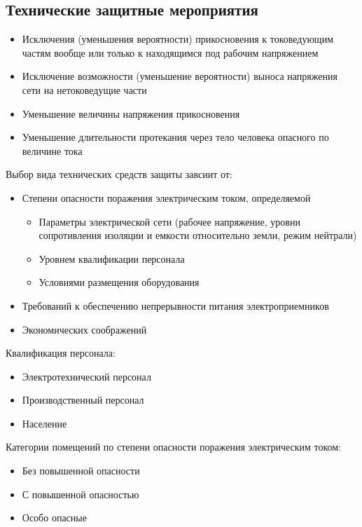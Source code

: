 \documentclass[a4paper, 14pt]{extarticle}
\begin{document}
\subsection{Технические защитные мероприятия}
\begin{itemize}
    \item Исключения (уменьшения вероятности) прикосновения к токоведующим частям вообще или только к находящимся под рабочим напряжением
    \item Исключение возможности (уменьшение вероятности) выноса напряжения сети на нетоковедущие части
    \item Уменьшение величины напряжения прикосновения
    \item Уменьшение длительности протекания через тело человека опасного по величине тока
\end{itemize}

Выбор вида технических средств защиты завсиит от:
\begin{itemize}
    \item Степени опасности поражения электрическим током, определяемой
    \begin{itemize}
        \item Параметры электрической сети (рабочее напряжение, уровни сопротивления изоляции и емкости относительно земли, режим нейтрали)
        \item Уровнем квалификации персонала
        \item Условиями размещения оборудования
    \end{itemize}
    \item Требований к обеспечению непрерывности питания электроприемников
    \item Экономических соображений
\end{itemize}

Квалификация персонала:
\begin{itemize}
    \item Электротехнический персонал
    \item Производственный персонал
    \item Население
\end{itemize}

Категории помещений по степени опасности поражения электрическим током:
\begin{itemize}
    \item Без повышенной опасности
    \item С повышенной опасностью
    \item Особо опасные
\end{itemize}
\end{document}
